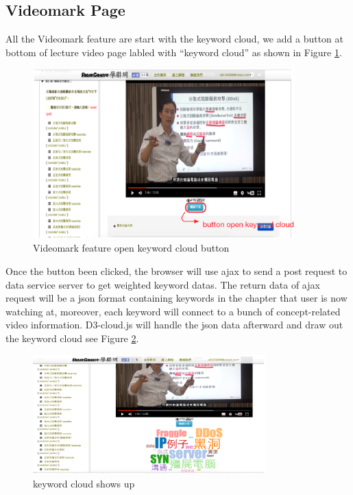 \subsection{Videomark Page}
All the Videomark feature are start with the keyword cloud, we add a button at bottom of lecture video page labled with ``keyword cloud'' as shown in Figure \ref{fig:cloudbutton}.

\begin{figure}[H]
    \centering
    \includegraphics[width = 0.9\textwidth]{fig/cloudbutton.eps}
    \caption{Videomark feature open keyword cloud button}
    \label{fig:cloudbutton}
\end{figure}

Once the button been clicked, the browser will use ajax to send a post request to data service server to get weighted keyword datas.
The return data of ajax request will be a json format containing keywords in the chapter that user is now watching at, moreover, each keyword will connect to a bunch of concept-related video information.
D3-cloud.js will handle the json data afterward and draw out the keyword cloud see Figure \ref{fig:cloudopened}.

\begin{figure}[H]
    \centering
    \includegraphics[width = 0.8\textwidth]{fig/cloudopened.eps}
    \caption{keyword cloud shows up}
    \label{fig:cloudopened}
\end{figure}

